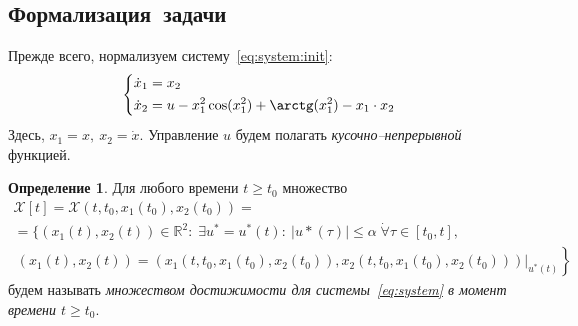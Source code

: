 \documentclass[11pt, oneside, final]{article}
\theoremstyle{break}
\numberwithin{equation}{section}
\theoremstyle{plain}
\theoremstyle{definition}
\newtheorem{definition}{Определение}[section]
\newcommand \real{\mathbb{R}}
\begin{document}
    \subsection{Формализация~задачи} 
    \label{sub:formal}
    Прежде всего, нормализуем систему~\eqref{eq:system:init}:
    \begin{equation}
        \label{eq:system}
        \left\{
        \begin{aligned}
            &\dot x_1 = x_2 \\
            &\dot x_2 = u - x_1^2 \cos(x_1^2) + \arctg(x_1^2) - x_1\cdot x_2\\
        \end{aligned}
        \right.
    \end{equation}   
    Здесь, \(x_1 = x,\: x_2 = \dot x\). Управление \(u\) будем полагать \emph{кусочно--непрерывной} функцией.
    \begin{definition} Для любого времени \(t \geqslant t_0\) множество 
        \begin{multline*}
            \mathcal{X}[t] = \mathcal{X}(t, t_0, x_1(t_0), x_2(t_0)) =\\ = \Bigg\{(x_1(t), x_2(t)) \in \real^2:\; \exists u^* = u^*(t):\: |u*(\tau)| \leqslant \alpha \; \dot \forall \tau \in [t_0, t],\\\left.\: (x_1(t), x_2(t)) = (x_1(t, t_0, x_1(t_0), x_2(t_0)), x_2(t, t_0, x_1(t_0), x_2(t_0)))\bigg\rvert_{u^*(t)}\right\}
        \end{multline*}
        будем называть \emph{множеством достижимости для системы~\eqref{eq:system} в момент времени \(t \geqslant t_0\)}.
    \end{definition}
    \pagebreak
\end{document}
